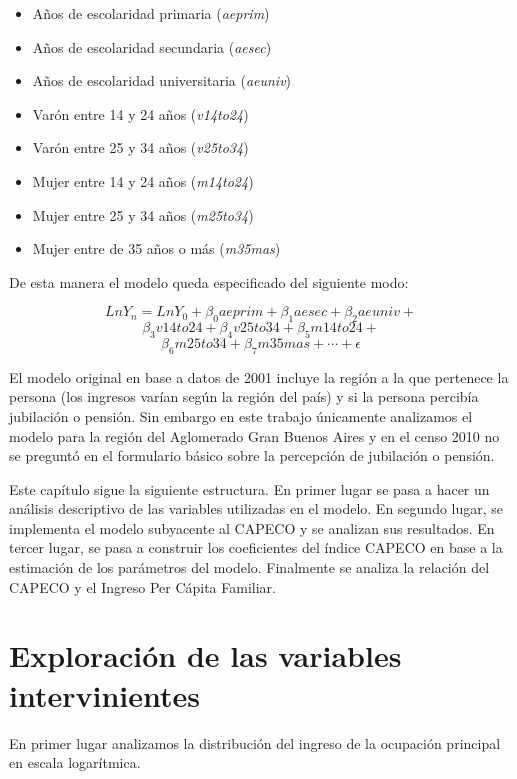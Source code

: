 \begin{itemize}
	\item  Años de escolaridad primaria (\textit{aeprim})
	\item Años de escolaridad secundaria (\textit{aesec})
	\item Años de escolaridad universitaria (\textit{aeuniv})
	\item Varón entre 14 y 24 años (\textit{v14to24})
	\item Varón entre 25 y 34 años (\textit{v25to34})
	\item Mujer entre 14 y 24 años (\textit{m14to24})
	\item Mujer entre 25 y 34 años (\textit{m25to34})
	\item Mujer entre de 35 años o más (\textit{m35mas})
\end{itemize}

De esta manera el modelo queda especificado del siguiente modo:

$$Ln Y_n = Ln Y_0 + \beta_0 aeprim + \beta_1 aesec + \beta_2 aeuniv + $$
$$\beta_3 v14to24 + \beta_4 v25to34 +  \beta_5 m14to24 +  $$
$$\beta_6 m25to34 +  \beta_7 m35mas +  \cdots + \epsilon $$


El modelo original en base a datos de 2001 incluye la región a la que pertenece la persona (los ingresos varían según la región del país) y si la persona percibía jubilación o pensión. Sin embargo en este trabajo únicamente analizamos el modelo para la región del Aglomerado Gran Buenos Aires y en el censo 2010 no se preguntó en el formulario básico sobre la percepción de jubilación o pensión.

Este capítulo sigue la siguiente estructura. En primer lugar se pasa a hacer un análisis descriptivo de las variables utilizadas en el modelo. En segundo lugar, se implementa el modelo subyacente al CAPECO y se analizan sus resultados. En tercer lugar, se pasa a construir los coeficientes del índice CAPECO en base a la estimación de los parámetros del modelo. Finalmente se analiza la relación del CAPECO y el Ingreso Per Cápita Familiar.

\section{Exploración de las variables intervinientes}

En primer lugar analizamos la distribución del ingreso de la ocupación principal en escala logarítmica. 

